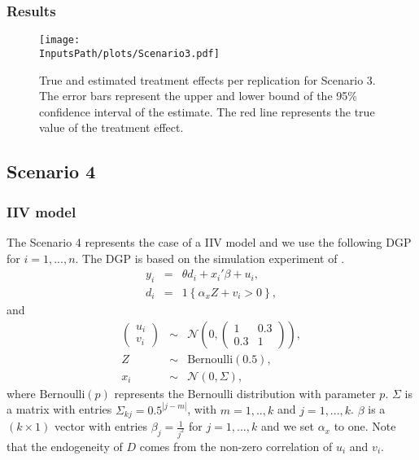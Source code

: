 \documentclass[10pt]{article}
\newcommand*{\InputsFolderPath}{C:/DEV/DML/src/data/}
\newcommand*{\InputsPath}{\InputsFolderPath/20221107}
\begin{document}
\subsubsection{Results}
\begin{figure}[H]
	\begin{center}
		\texttt{[image: \\InputsPath/plots/Scenario3.pdf]}
		\caption{True and estimated treatment effects per replication for Scenario 3. The error bars represent the upper and lower bound of the 95\% confidence interval of the estimate. The red line represents the true value of the treatment effect.}
		\label{Scenario3}
	\end{center}
\end{figure}



\subsection{Scenario 4}
\subsubsection{IIV model}
The Scenario 4 represents the case of a IIV model and we use the following DGP for $i=1,...,n$.
The DGP is based on the simulation experiment of \cite{Farb2020}.
\begin{eqnarray*}\label{dgp_4.1}
y_i &=& \theta d_i + x_i' \beta + u_i, \\	
d_i &=& 1\left\lbrace \alpha_x Z + v_i > 0 \right\rbrace,
\end{eqnarray*}
and
\begin{eqnarray*}\label{dgp_4.2}
\left(\begin{matrix} u_i \\ v_i \end{matrix} \right) &\sim&
\mathcal{N}\left(0, \left(\begin{matrix} 1 & 0.3 \\ 0.3 & 1 \end{matrix} \right) \right), \\
Z &\sim& \text{Bernoulli}(0.5), \\
x_i &\sim& \mathcal{N}(0, \Sigma),
\end{eqnarray*}
where $\text{Bernoulli}(p)$ represents the Bernoulli distribution with parameter $p$. 
$\Sigma$ is a matrix with entries $\Sigma_{kj} = 0.5^{|j-m|}$, with $m=1,..,k$ and $j=1,...,k$.
$\beta$ is a $(k \times 1)$ vector with entries $\beta_j=\frac{1}{j^2}$ for $j=1,...,k$ and we set $\alpha_x$ to one.
Note that the endogeneity of $D$ comes from the non-zero correlation of $u_i$ and $v_i$.
\end{document}
